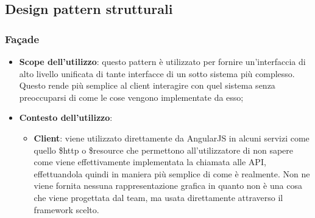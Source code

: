 %


\subsection{Design pattern strutturali} %
\label{sub:design_pattern_strutturali}
	\subsubsection{Fa\c{c}ade} %
	\label{ssub:facade}
		\begin{itemize}
			\item \textbf{Scope dell'utilizzo}: questo pattern è utilizzato per fornire un'interfaccia di alto livello unificata di tante interfacce di un sotto sistema più complesso. Questo rende più semplice al client interagire con quel sistema senza preoccuparsi di come le cose vengono implementate da esso;
			\item \textbf{Contesto dell'utilizzo}:
				\begin{itemize}
					\item \textbf{Client}: viene utilizzato direttamente da AngularJS in alcuni servizi come quello \$http o \$resource che permettono all'utilizzatore di non sapere come viene effettivamente implementata la chiamata alle API, effettuandola quindi in maniera più semplice di come è realmente. \newline
					Non ne viene fornita nessuna rappresentazione grafica in quanto non è una cosa che viene progettata dal team, ma usata direttamente attraverso il framework scelto.
				\end{itemize}
		\end{itemize}


